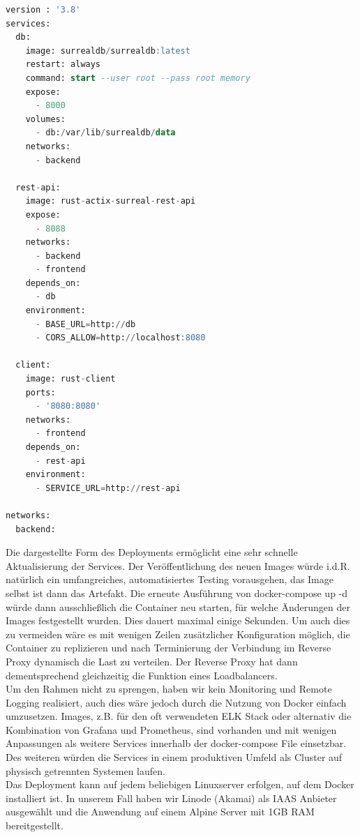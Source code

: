 \documentclass[notitlepage, hidelinks]{article}
\begin{document}
\begin{lstlisting}[language=SQL,frame=single,caption=docker-compose.yml zur Bereitstellung des kompletten Stacks,label=deploymenttwo]
version : '3.8'
services:
  db:
    image: surrealdb/surrealdb:latest
    restart: always
    command: start --user root --pass root memory
    expose:
      - 8000
    volumes:
      - db:/var/lib/surrealdb/data
    networks:
      - backend

  rest-api:
    image: rust-actix-surreal-rest-api    
    expose: 
      - 8088
    networks:
      - backend
      - frontend
    depends_on:
      - db
    environment:
      - BASE_URL=http://db
      - CORS_ALLOW=http://localhost:8080
      
  client:
    image: rust-client    
    ports: 
      - '8080:8080'
    networks:
      - frontend
    depends_on:
      - rest-api
    environment:
      - SERVICE_URL=http://rest-api

networks:
  backend:
\end{lstlisting}

Die dargestellte Form des Deployments ermöglicht eine sehr schnelle Aktualisierung der Services. Der Veröffentlichung des neuen Images würde i.d.R. natürlich ein umfangreiches, automatisiertes Testing vorausgehen, das Image selbst ist dann das Artefakt. Die erneute Ausführung von docker-compose up -d würde dann ausschließlich die Container neu starten, für welche Änderungen der Images festgestellt wurden. Dies dauert maximal einige Sekunden. Um auch dies zu vermeiden wäre es mit wenigen Zeilen zusätzlicher Konfiguration möglich, die Container zu replizieren und nach Terminierung der Verbindung im Reverse Proxy dynamisch die Last zu verteilen. Der Reverse Proxy hat dann dementsprechend gleichzeitig die Funktion eines Loadbalancers. \\
Um den Rahmen nicht zu sprengen, haben wir kein Monitoring und Remote Logging realisiert, auch dies wäre jedoch durch die Nutzung von Docker einfach umzusetzen. Images, z.B. für den oft verwendeten ELK Stack oder alternativ die Kombination von Grafana und Prometheus, sind vorhanden und mit wenigen Anpassungen als weitere Services innerhalb der docker-compose File einsetzbar. Des weiteren würden die Services in einem produktiven Umfeld als Cluster auf physisch getrennten Systemen laufen.\\
Das Deployment kann auf jedem beliebigen Linuxserver erfolgen, auf dem Docker installiert ist. In unserem Fall haben wir Linode (Akamai) als IAAS Anbieter ausgewählt und die Anwendung auf einem Alpine Server mit 1GB RAM bereitgestellt. 
\end{document}
